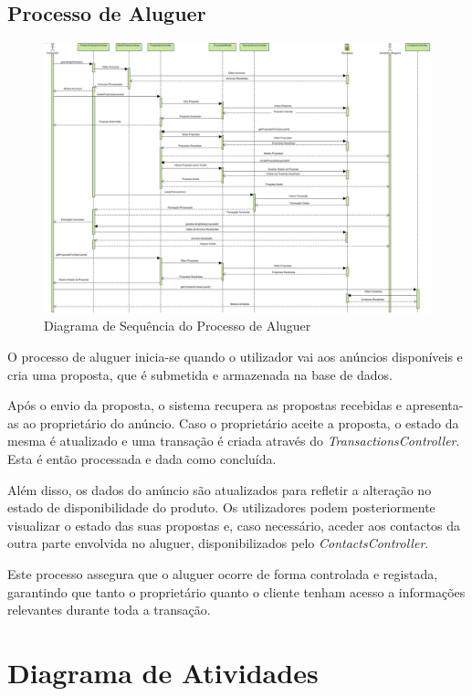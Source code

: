 \documentclass[a4paper, 12pt]{article} %
\begin{document}
\subsection{Processo de Aluguer}
\begin{figure}[ht]
	\centering
	\includegraphics[width=\textwidth]{../images/sequence-diagram-rental.png}
	\caption{Diagrama de Sequência do Processo de Aluguer}
	\label{fig:diagrama_sequencia_aluguer}
\end{figure}

O processo de aluguer inicia-se quando o utilizador vai aos anúncios disponíveis e cria uma proposta, que é submetida e armazenada na base de dados.

Após o envio da proposta, o sistema recupera as propostas recebidas e apresenta-as ao proprietário do anúncio. Caso o proprietário aceite a proposta, o estado da mesma é atualizado e uma transação é criada através do \textit{TransactionsController}. Esta é então processada e dada como concluída.

Além disso, os dados do anúncio são atualizados para refletir a alteração no estado de disponibilidade do produto. Os utilizadores podem posteriormente visualizar o estado das suas propostas e, caso necessário, aceder aos contactos da outra parte envolvida no aluguer, disponibilizados pelo \textit{ContactsController}.

Este processo assegura que o aluguer ocorre de forma controlada e registada, garantindo que tanto o proprietário quanto o cliente tenham acesso a informações relevantes durante toda a transação.

\newpage
\section{Diagrama de Atividades}
\end{document}
